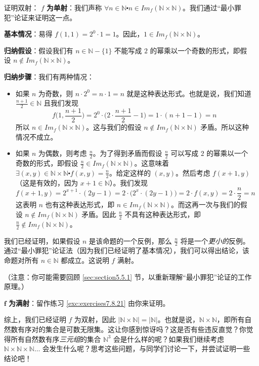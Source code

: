 \begin{example}
\begin{proofs}{证明双射：}
        $f$ \textbf{为单射}：我们声称 $\forall n \in \mathbb{N} \centerdot n \in Im_f (\mathbb{N} \times \mathbb{N})$。我们通过``最小罪犯''论证来证明这一点。

        \textbf{基本情况}：易得 $f(1, 1) = 2^0 \cdot 1 = 1$。因此，$1 \in Im_f (\mathbb{N} \times \mathbb{N})$。

        \textbf{归纳假设}：假设我们有 $n \in \mathbb{N} - \{1\}$ 不能写成 $2$ 的幂乘以一个奇数的形式，即假设 $n \notin Im_f (\mathbb{N} \times \mathbb{N})$。

        \textbf{归纳步骤}：我们有两种情况：
        \begin{itemize}
            \item 如果 $n$ 为奇数，则 $n \cdot 2^0 = n \cdot 1 = n$ 就是这种表达形式。也就是说，我们知道 $\frac{n+1}{2} \in \mathbb{N}$ 且我们发现
                  \[f\Big(1, \frac{n+1}{2}\Big) = 2^0 \cdot \Big(2 \cdot \frac{n+1}{2}-1\Big) = 1 \cdot (n + 1 - 1) = n\]
                  所以 $n \in Im_f (\mathbb{N} \times \mathbb{N})$。这与我们的假设 $n \notin Im_f (\mathbb{N} \times \mathbb{N})$ 矛盾。所以这种情况不成立。
            \item 如果 $n$ 为偶数，则考虑 $\frac{n}{2}$。为了得到矛盾而假设 $\frac{n}{2}$ 可以写成 $2$ 的幂乘以一个奇数的形式，即假设 $\frac{n}{2} \in Im_f (\mathbb{N} \times \mathbb{N})$。这意味着 $\exists (x, y) \in \mathbb{N} \times \mathbb{N} \centerdot f(x, y) = \frac{n}{2}$。给定这样的 $(x,y)$。然后考虑 $f(x + 1, y)$（这是有效的，因为 $x+1 \in \mathbb{N}$）。我们发现
                  \[f(x + 1, y) = 2^{x+1} \cdot (2y - 1) = 2 \cdot \big(2^x \cdot (2y - 1)\big) =  2 \cdot f(x, y) = 2 \cdot \frac{n}{2} = n\]
                  这表明 $n$ 也有这种表达形式，即 $n \in Im_f (\mathbb{N} \times \mathbb{N})$。而这再一次与我们的假设 $n \notin Im_f (\mathbb{N} \times \mathbb{N})$ 矛盾。因此 $\frac{n}{2}$ 不具有这种表达形式，即 $\frac{n}{2} \notin Im_f (\mathbb{N} \times \mathbb{N})$。
        \end{itemize}

        我们已经证明，如果假设 $n$ 是该命题的一个反例，那么 $\frac{n}{2}$ 将是一个\emph{更小的}反例。通过``最小罪犯''论证法（因为我们已经证明了基本情况），我们可以得出结论，该命题对所有 $n \in \mathbb{N}$ 都成立。这说明 $f$ 满射。
    \end{proofs}

    （注意：你可能需要回顾 \ref{sec:section5.5.1} 节，以重新理解``最小罪犯''论证的工作原理。）

    $\mathbf{f}$ \textbf{为满射}：留作练习 \ref{exc:exercises7.8.21} 由你来证明。

    综上，我们已经证明 $f$ 为双射，因此 $|\mathbb{N} \times \mathbb{N}| = |\mathbb{N}|$。也就是说，$\mathbb{N} \times \mathbb{N}$，即所有自然数有序对的集合是可数无限集。这让你感到惊讶吗？这是否有些违反直觉？你觉得所有自然数有序\emph{三元组}的集合 $\mathbb{N}^3$ 会是什么样的呢？如果我们继续考虑 $\mathbb{N} \times \mathbb{N} \times \mathbb{N} \dots$ 会发生什么呢？思考这些问题，与同学们讨论一下，并尝试证明一些结论吧！
\end{example}

